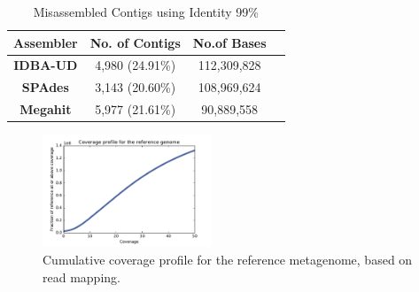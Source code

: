 \documentclass[10pt,a4paper,twocolumn]{article}
\begin{document}

\begin{table}[t]
\caption{Misassembled Contigs using Identity 99\%}
\centering
\begin{tabular}{|c|c|c|c|}
\hline

\textbf{Assembler}& \textbf{No. of Contigs} &\textbf{No.of Bases} \\ [0.5ex] %
\hline
\textbf{IDBA-UD}& 4,980 (24.91\%) &112,309,828\\
\hline
\textbf{SPAdes} & 3,143 (20.60\%) &108,969,624 \\
\hline
\textbf{Megahit}& 5,977 (21.61\%) &90,889,558  \\
\hline
\end{tabular}
\label{table:misassembled} 
\end{table}


 
\begin{figure}[!h]
\centering
\includegraphics[width=0.45\textwidth]{CoverageProfile.pdf}  
\caption{\label{fig:coverage-profile} Cumulative coverage profile for the reference metagenome, based on read mapping. }
\end{figure}


\end{document}
